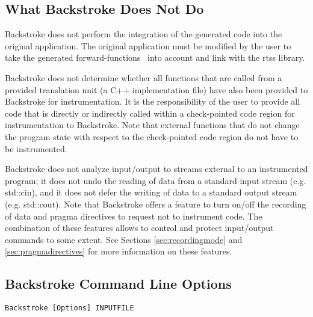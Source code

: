 \documentclass[english,12pt, titlepage]{article}      %
\newcommand{\forwardfunctions}{forward-functions}
\begin{document}
\subsection{What Backstroke Does Not Do}

Backstroke does not perform the integration of the generated code into
the original application. The original application must be modified by
the user to take the generated \forwardfunctions~ into account and
link with the rtss library.

Backstroke does not determine whether all functions that are called
from a provided translation unit (a C++ implementation file) have also
been provided to Backstroke for instrumentation. It is the
responsibility of the user to provide all code that is directly or
indirectly called within a check-pointed code region for
instrumentation to Backstroke. Note that external functions that do
not change the program state with respect to the check-pointed code region do not
have to be instrumented.

Backstroke does not analyze input/output to streams external to an
instrumented program; it does not undo the reading of data from a
standard input stream (e.g. std::cin), and it does not defer the
writing of data to a standard output stream (e.g. std::cout). Note
that Backstroke offers a feature to turn on/off the recording of data
and pragma directives to request not to instrument
code. The combination of these features allows to control and protect
input/output commands to some extent. See Sections
\ref{sec:recordingmode} and \ref{sec:pragmadirectives} for more
information on these features.

\subsection{Backstroke Command Line Options}

\verb+Backstroke [Options] INPUTFILE+

\end{document}
